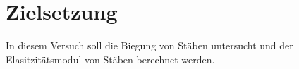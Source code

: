 \section{Zielsetzung}
\label{sec:Zielsetzung}
In diesem Versuch soll die Biegung von Stäben untersucht und der Elasitzitätsmodul
von Stäben berechnet werden.
